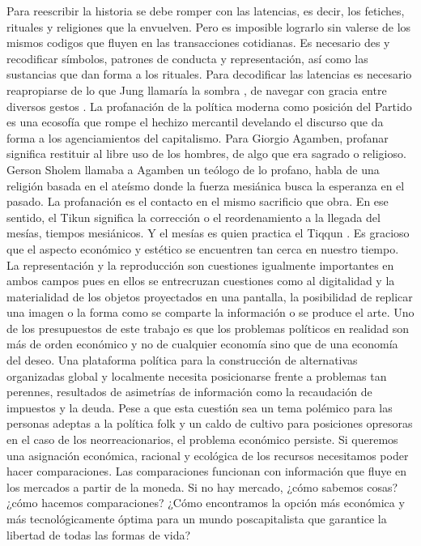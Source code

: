 Para reescribir la historia se debe romper con las latencias, es decir, los fetiches, rituales y religiones que la envuelven. Pero es imposible lograrlo sin valerse de los mismos codigos que fluyen en las transacciones cotidianas. Es necesario des y recodificar símbolos, patrones de conducta y representación, así como las sustancias que dan forma a los rituales. Para decodificar las latencias es necesario reapropiarse de lo que Jung llamaría la sombra \autocite{abramsEncuentroConSombra2016}, de navegar con gracia entre diversos gestos \autocite{didi-hubermanGestosAirePiedra2018}. La profanación de la política moderna como posición del Partido es una ecosofía que rompe el hechizo mercantil develando el discurso que da forma a los agenciamientos del capitalismo. Para Giorgio Agamben, profanar significa restituir al libre uso de los hombres, de algo que era sagrado o religioso. Gerson Sholem llamaba a Agamben un teólogo de lo profano, habla de una religión basada en el ateísmo donde la fuerza mesiánica busca la esperanza en el pasado. La profanación es el contacto en el mismo sacrificio que obra. En ese sentido, el Tikun significa la corrección o el reordenamiento a la llegada del mesías, tiempos mesiánicos. Y el mesías es quien practica el Tiqqun \autocite{agambenHomoSacer1998}. Es gracioso que el aspecto económico y estético se encuentren tan cerca en nuestro tiempo. La representación y la reproducción son cuestiones igualmente importantes en ambos campos pues en ellos se entrecruzan cuestiones como al digitalidad y la materialidad de los objetos proyectados en una pantalla, la posibilidad de replicar una imagen o la forma como se comparte la información o se produce el arte. Uno de los presupuestos de este trabajo es que los problemas políticos en realidad son más de orden económico y no de cualquier economía sino que de una economía del deseo. Una plataforma política para la construcción de alternativas organizadas global y localmente necesita posicionarse frente a problemas tan perennes, resultados de asimetrías de información \autocite{smithHayekMeetsInformation2017} como la recaudación de impuestos y la deuda. Pese a que esta cuestión sea un tema polémico para las personas adeptas a la política folk y un caldo de cultivo para posiciones opresoras en el caso de los neorreacionarios, el problema económico persiste. Si queremos una asignación económica, racional y ecológica de los recursos necesitamos poder hacer comparaciones. Las comparaciones funcionan con información que fluye en los mercados a partir de la moneda. Si no hay mercado, ¿cómo sabemos cosas? ¿cómo hacemos comparaciones? ¿Cómo encontramos la opción más económica y más tecnológicamente óptima para un mundo poscapitalista que garantice la libertad de todas las formas de vida?


